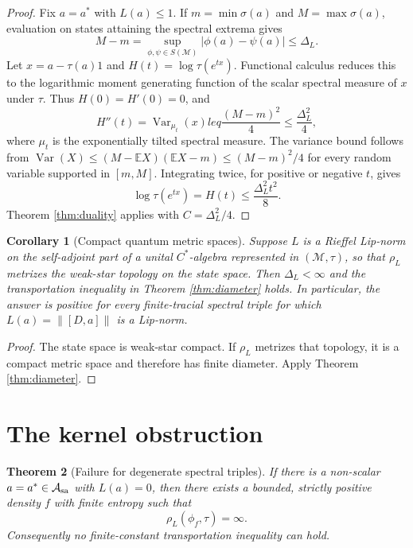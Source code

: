 \documentclass[11pt]{article}
\newtheorem{theorem}{Theorem}
\newtheorem{corollary}[theorem]{Corollary}
\begin{document}
\begin{proof}
Fix $a=a^*$ with $L(a)\leq1$.  If $m=\min\sigma(a)$ and
$M=\max\sigma(a)$, evaluation on states attaining the spectral extrema gives
\[
 M-m=\sup_{\phi,\psi\in S(\mathcal M)}|\phi(a)-\psi(a)|\leq\Delta_L.
\]
Let $x=a-\tau(a)1$ and $H(t)=\log\tau(e^{tx})$.  Functional calculus reduces
this to the logarithmic moment generating function of the scalar spectral
measure of $x$ under $\tau$.  Thus $H(0)=H'(0)=0$, and
\[
 H''(t)=\operatorname{Var}_{\mu_t}(x)leq\frac{(M-m)^2}{4}
 \leq\frac{\Delta_L^2}{4},
\]
where $\mu_t$ is the exponentially tilted spectral measure.  The variance
bound follows from
$\operatorname{Var}(X)\leq(M-\mathbb EX)(\mathbb EX-m)\leq(M-m)^2/4$
for every random variable supported in $[m,M]$.  Integrating twice, for
positive or negative $t$, gives
\[
 \log\tau(e^{tx})=H(t)\leq\frac{\Delta_L^2t^2}{8}.
\]
Theorem \ref{thm:duality} applies with $C=\Delta_L^2/4$.
\end{proof}

\begin{corollary}[Compact quantum metric spaces]\label{cor:compact}
Suppose $L$ is a Rieffel Lip-norm on the self-adjoint part of a unital
$C^*$-algebra represented in $(\mathcal M,\tau)$, so that $\rho_L$ metrizes
the weak-star topology on the state space.  Then $\Delta_L<\infty$ and the
transportation inequality in Theorem \ref{thm:diameter} holds.  In particular,
the answer is positive for every finite-tracial spectral triple for which
$L(a)=\|[D,a]\|$ is a Lip-norm.
\end{corollary}

\begin{proof}
The state space is weak-star compact.  If $\rho_L$ metrizes that topology, it
is a compact metric space and therefore has finite diameter.  Apply Theorem
\ref{thm:diameter}.
\end{proof}

\section*{The kernel obstruction}

\begin{theorem}[Failure for degenerate spectral triples]\label{thm:kernel}
If there is a non-scalar $a=a^*\in\mathcal A_{\rm sa}$ with $L(a)=0$, then
there exists a bounded, strictly positive density $f$ with finite entropy such
that
\[
 \rho_L(\phi_f,\tau)=\infty.
\]
Consequently no finite-constant transportation inequality can hold.
\end{theorem}
\end{document}
